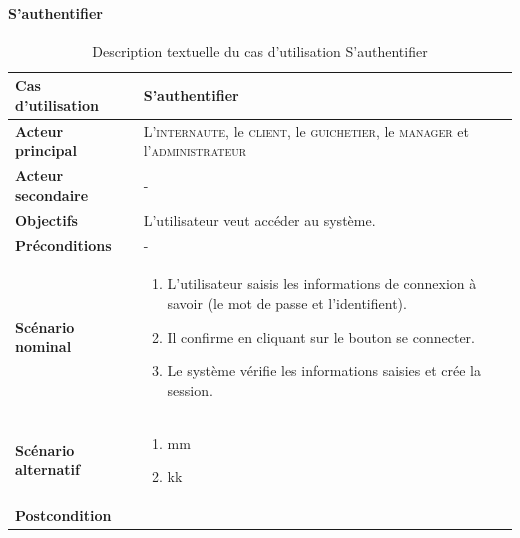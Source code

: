         \paragraph[S’authentifier]{S’authentifier}
            \begin{longtable}{p{4cm} p{9cm}}
                \caption{Description textuelle du cas d’utilisation S’authentifier}
                \label{table:usecaseSauth}
                \\\hline\hline
                    \textbf{Cas d’utilisation} & \textbf{S’authentifier}
                \\\hline\hline
                        \textbf{Acteur principal} & L’\textsc{internaute}, le \textsc{client},
                        le \textsc{guichetier}, le \textsc{manager} et l’\textsc{administrateur}
                    \\
                        \textbf{Acteur secondaire} & -
                    \\
                        \textbf{Objectifs} & L’utilisateur veut accéder au système.
                    \\
                        \textbf{Préconditions} & -
                    \\
                    \textbf{Scénario nominal} &
                        \begin{enumerate}[leftmargin=*]
                            \item L’utilisateur saisis les informations de connexion à savoir (le mot de
                            passe et l’identifient).
                            \item Il confirme en cliquant sur le bouton se connecter.
                            \item Le système vérifie les informations saisies et crée la session.
                        \end{enumerate}
                    \\
                    \textbf{Scénario alternatif} &
                    \begin{enumerate}[leftmargin=*]
                            \item mm
                            \item kk
                        \end{enumerate}
                    \\
                    \textbf{Postcondition}
                \\\bottomrule
            \end{longtable}

